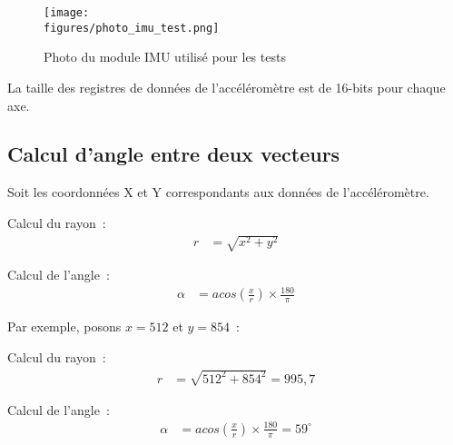 \begin{figure}[H]
    \centering
    \texttt{[image: \\figures/photo\_imu\_test.png]}
    \decoRule
    \caption[
    Photo du module IMU utilisé pour les tests]{
    Photo du module IMU utilisé pour les tests}
    \label{fig:Photo du module IMU utilisé pour les tests}
    \end{figure}

\vspace{1cm}

La taille des registres de données de l’accéléromètre est de 16-bits pour chaque axe.

\subsection{Calcul d’angle entre deux vecteurs}

Soit les coordonnées X et Y correspondants aux données de l’accéléromètre.

\vspace{1cm}

Calcul du rayon~:
\begin{align*}
r&=\sqrt{x^{2}+y^{2}}
\end{align*}


Calcul de l'angle~:
\begin{align*}
\alpha&=acos\left(\frac{x}{r}\right)\times\frac{180}{\pi}
\end{align*}

\vspace{1cm}

Par exemple, posons $x=512$ et $y=854$~:

\vspace{1cm}

Calcul du rayon~:
\begin{align*}
r&=\sqrt{512^{2}+854^{2}}=995,7
\end{align*}


Calcul de l'angle~:
\begin{align*}
\alpha&=acos\left(\frac{x}{r}\right)\times\frac{180}{\pi}=59^{\circ}
\end{align*}

	
